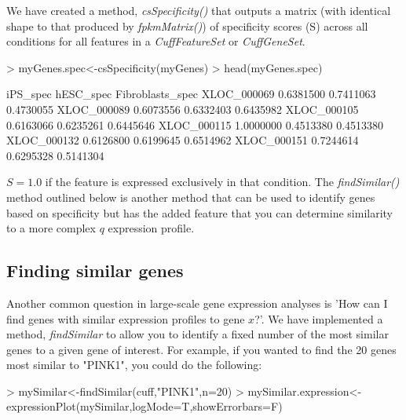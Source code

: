 \documentclass[10pt]{article}
\newcommand{\Rclass}[1]{{\textit{#1}}}
\newcommand{\Rmethod}[1]{{\textit{#1}}}
\begin{document}
We have created a method, \Rmethod{csSpecificity()} that outputs a matrix (with identical shape to that produced by \Rmethod{fpkmMatrix()}) of specificity scores (S) across all conditions for all features in a \Rclass{CuffFeatureSet} or \Rclass{CuffGeneSet}.
\begin{Schunk}
\begin{Sinput}
> myGenes.spec<-csSpecificity(myGenes)
> head(myGenes.spec)
\end{Sinput}
\begin{Soutput}
             iPS_spec hESC_spec Fibroblasts_spec
XLOC_000069 0.6381500 0.7411063        0.4730055
XLOC_000089 0.6073556 0.6332403        0.6435982
XLOC_000105 0.6163066 0.6235261        0.6445646
XLOC_000115 1.0000000 0.4513380        0.4513380
XLOC_000132 0.6126800 0.6199645        0.6514962
XLOC_000151 0.7244614 0.6295328        0.5141304
\end{Soutput}
\end{Schunk}
$S=1.0$ if the feature is expressed exclusively in that condition.
The \Rmethod{findSimilar()} method outlined below is another method that can be used to identify genes based on specificity but has the added feature that you can determine similarity to a more complex $q$ expression profile.

\clearpage

\subsection{Finding similar genes}
Another common question in large-scale gene expression analyses is 'How can I find genes with similar expression profiles to gene $x$?'. We have implemented a method, \Rmethod{findSimilar} to allow you to identify a fixed number of the most similar genes to a given gene of interest.
For example, if you wanted to find the 20 genes most similar to "PINK1", you could do the following:

\begin{Schunk}
\begin{Sinput}
> mySimilar<-findSimilar(cuff,"PINK1",n=20)
> mySimilar.expression<-expressionPlot(mySimilar,logMode=T,showErrorbars=F)
\end{Sinput}
\end{Schunk}

\begin{figure}[htp]
	\begin{center}
	
	\end{center}
\end{figure}
\end{document}
